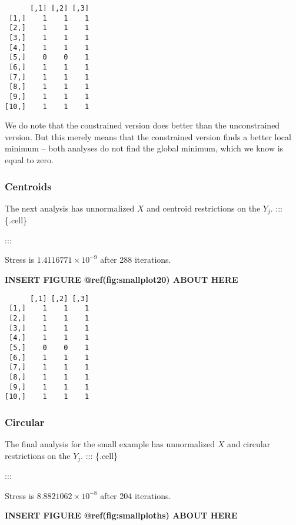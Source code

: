 \documentclass[
  12pt,
  letterpaper,
  DIV=11,
  numbers=noendperiod]{scrartcl}
\begin{document}
\begin{verbatim}
      [,1] [,2] [,3]
 [1,]    1    1    1
 [2,]    1    1    1
 [3,]    1    1    1
 [4,]    1    1    1
 [5,]    0    0    1
 [6,]    1    1    1
 [7,]    1    1    1
 [8,]    1    1    1
 [9,]    1    1    1
[10,]    1    1    1
\end{verbatim}

We do note that the constrained version does better than the
unconstrained version. But this merely means that the constrained
version finds a better local minimum -- both analyses do not find the
global minimum, which we know is equal to zero.

\subsubsection{Centroids}\label{centroids}

The next analysis has unnormalized \(X\) and centroid restrictions on
the \(Y_j\). ::: \{.cell\}

:::

Stress is \ensuremath{1.4116771\times 10^{-9}} after 288 iterations.

\begin{greybox}

\begin{center}
\textbf{INSERT FIGURE @ref(fig:smallplot20) ABOUT HERE}

\end{center}

\end{greybox}

\begin{verbatim}
      [,1] [,2] [,3]
 [1,]    1    1    1
 [2,]    1    1    1
 [3,]    1    1    1
 [4,]    1    1    1
 [5,]    0    0    1
 [6,]    1    1    1
 [7,]    1    1    1
 [8,]    1    1    1
 [9,]    1    1    1
[10,]    1    1    1
\end{verbatim}

\subsubsection{Circular}\label{circular}

The final analysis for the small example has unnormalized \(X\) and
circular restrictions on the \(Y_j\). ::: \{.cell\}

:::

Stress is \ensuremath{8.8821062\times 10^{-8}} after 204 iterations.

\begin{greybox}

\begin{center}
\textbf{INSERT FIGURE @ref(fig:smallploths) ABOUT HERE}

\end{center}

\end{greybox}
\end{document}
